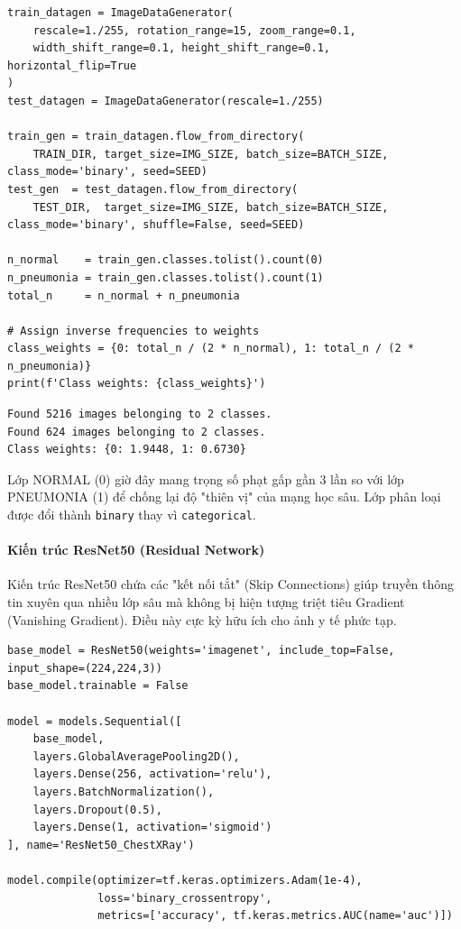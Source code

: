 \begin{lstlisting}[style=pythoncode, caption={Thiết lập Generator và tính toán Class Weights}]
train_datagen = ImageDataGenerator(
    rescale=1./255, rotation_range=15, zoom_range=0.1,
    width_shift_range=0.1, height_shift_range=0.1, horizontal_flip=True
)
test_datagen = ImageDataGenerator(rescale=1./255)

train_gen = train_datagen.flow_from_directory(
    TRAIN_DIR, target_size=IMG_SIZE, batch_size=BATCH_SIZE, class_mode='binary', seed=SEED)
test_gen  = test_datagen.flow_from_directory(
    TEST_DIR,  target_size=IMG_SIZE, batch_size=BATCH_SIZE, class_mode='binary', shuffle=False, seed=SEED)

n_normal    = train_gen.classes.tolist().count(0)
n_pneumonia = train_gen.classes.tolist().count(1)
total_n     = n_normal + n_pneumonia

# Assign inverse frequencies to weights
class_weights = {0: total_n / (2 * n_normal), 1: total_n / (2 * n_pneumonia)}
print(f'Class weights: {class_weights}')
\end{lstlisting}

\begin{lstlisting}[style=consoleoutput, caption={Output: Các hệ số trọng số cân bằng lớp}]
Found 5216 images belonging to 2 classes.
Found 624 images belonging to 2 classes.
Class weights: {0: 1.9448, 1: 0.6730}
\end{lstlisting}

Lớp NORMAL (0) giờ đây mang trọng số phạt gấp gần 3 lần so với lớp PNEUMONIA (1) để chống lại độ "thiên vị" của mạng học sâu. Lớp phân loại được đổi thành \texttt{binary} thay vì \texttt{categorical}.

\paragraph{Kiến trúc ResNet50 (Residual Network)} \hfill\mbox{}

Kiến trúc ResNet50 chứa các "kết nối tắt" (Skip Connections) giúp truyền thông tin xuyên qua nhiều lớp sâu mà không bị hiện tượng triệt tiêu Gradient (Vanishing Gradient). Điều này cực kỳ hữu ích cho ảnh y tế phức tạp.

\begin{lstlisting}[style=pythoncode, caption={Định nghĩa mô hình ResNet50 chuyển giao}]
base_model = ResNet50(weights='imagenet', include_top=False, input_shape=(224,224,3))
base_model.trainable = False

model = models.Sequential([
    base_model,
    layers.GlobalAveragePooling2D(),
    layers.Dense(256, activation='relu'),
    layers.BatchNormalization(),
    layers.Dropout(0.5),
    layers.Dense(1, activation='sigmoid')
], name='ResNet50_ChestXRay')

model.compile(optimizer=tf.keras.optimizers.Adam(1e-4),
              loss='binary_crossentropy',
              metrics=['accuracy', tf.keras.metrics.AUC(name='auc')])
\end{lstlisting}

